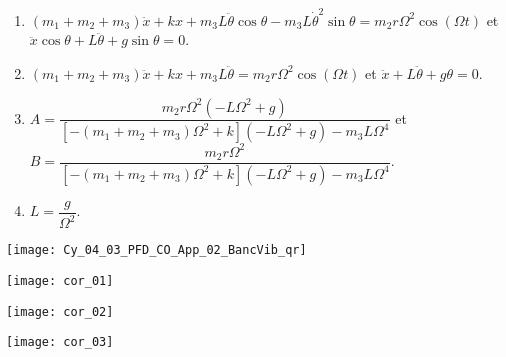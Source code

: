 \ifcolle
\else

\footnotesize
\begin{solution}
\begin{enumerate}
\item $\left( m_1 + m_2 + m_3\right) \ddot{x} + kx + m_3 L\ddot{\theta} \cos \theta - m_3 L\dot{\theta}^2 \sin \theta = m_2 r \Omega^2 \cos \left( \Omega t \right)$ et $\ddot{x}\cos\theta+L\ddot{\theta}+g\sin\theta=0$.
\item $\left( m_1 + m_2 + m_3\right) \ddot{x} + kx + m_3 L\ddot{\theta}= m_2 r \Omega^2 \cos \left( \Omega t \right)$ et $\ddot{x}+L\ddot{\theta}+g\theta=0$.
\item $A=\dfrac{m_2 r \Omega^2 \left( -L\Omega^2 + g\right)}{\left[-\left( m_1 + m_2 + m_3\right)\Omega^2 +k\right]\left( -L\Omega^2 +g\right)-m_3L\Omega^4}$ et 
$B=\dfrac{m_2 r \Omega^2 }{\left[-\left( m_1 + m_2 + m_3\right)\Omega^2 +k\right]\left( -L\Omega^2 +g\right)-m_3L\Omega^4}$.
\item $L=\dfrac{g}{\Omega^2}$.
\end{enumerate}
\end{solution}
\normalsize
\fi


\ifprof
\else
\begin{marginfigure}
\centering
\texttt{[image: Cy\_04\_03\_PFD\_CO\_App\_02\_BancVib\_qr]}
\end{marginfigure}
\fi

\ifprof
\begin{center}
\texttt{[image: cor\_01]}
\end{center}

\begin{center}
\texttt{[image: cor\_02]}
\end{center}

\begin{center}
\texttt{[image: cor\_03]}
\end{center}
\else
\fi